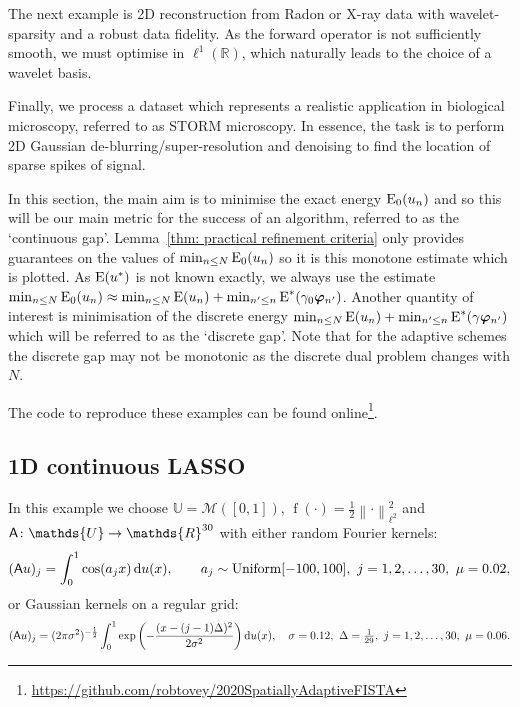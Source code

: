 \documentclass[smallextended]{svjour3}
\let\F\mathds\let\C\mathcal\newcommand{\R}{\F{R}}\newcommand{\A}{\tens{A}}
\newcommand{\norm}[1]{{\left\lVert #1 \right\rVert}}
\newcommand{\op}[1]{\operatorname{#1}}
\newcommand{\1}{\F{1}}
\newcommand{\diff}{\mathop{}\!\mathrm{d}}
\newcommand*{\var}[1]{%
	\IfEqCase{#1}{%
		{0}{u}%
		{1}{v}%
		{2}{w}%
	}[u#1]%
}
\newcommand*{\vars}[1]{%
	\IfEqCase{#1}{%
		{0}{\alpha}%
		{1}{\beta}%
		{2}{\gamma}%
		{3}{a}%
		{4}{b}%
		{5}{c}%
	}[k#1]%
}
\begin{document}
	The next example is 2D reconstruction from Radon or X-ray data with wavelet-sparsity and a robust data fidelity. As the forward operator is not sufficiently smooth, we must optimise in $\ell^1(\R)$, which naturally leads to the choice of a wavelet basis. 
	
	Finally, we process a dataset which represents a realistic application in biological microscopy, referred to as STORM microscopy. In essence, the task is to perform 2D Gaussian de-blurring/super-resolution and denoising to find the location of sparse spikes of signal.
	
	In this section, the main aim is to minimise the exact energy $\op{E}_0(\var0_n)$ and so this will be our main metric for the success of an algorithm, referred to as the `continuous gap'. Lemma~\ref{thm: practical refinement criteria} only provides guarantees on the values of $\min_{n\leq N}\op{E}_0(\var0_n)$ so it is this monotone estimate which is plotted. As $\op{E}(\var0^*)$ is not known exactly, we always use the estimate $\min_{n\leq N}\op{E}_0(\var0_n) \approx \min_{n\leq N}\op{E}(\var0_n) + \min_{n'\leq n}\op{E}^*(\vars2_0\vec{\varphi}_{n'})$. Another quantity of interest is minimisation of the discrete energy $\min_{n\leq N}\op{E}(\var0_n) + \min_{n'\leq n}\op{E}^*(\vars2\vec{\varphi}_{n'})$ which will be referred to as the `discrete gap'. Note that for the adaptive schemes the discrete gap may not be monotonic as the discrete dual problem changes with $N$.
	
	The code to reproduce these examples can be found online\footnote{\href{https://github.com/robtovey/2020SpatiallyAdaptiveFISTA}{https://github.com/robtovey/2020SpatiallyAdaptiveFISTA}}.
	
	
	\subsection{1D continuous LASSO}\label{sec: 1D Lasso examples}
	In this example we choose $\F{U}=\C M([0,1])$, $\op{f}(\cdot)=\frac12\norm{\cdot}_{\ell^2}^2$ and $\A\colon \F{U}\to \R^{30}$ with either random Fourier kernels:
	\begin{equation}
		(\A\var0)_j = \int_0^1\cos(\vars3_jx)\diff\var0(x), \qquad \vars3_j\sim \op{Uniform}[-100,100],\ j=1,2,\ldots,30,\ \mu =0.02, 
	\end{equation}
	or Gaussian kernels on a regular grid:
	\begin{equation}
		(\A\var0)_j = (2\pi\sigma^2)^{-\frac12}\int_0^1\exp\left(-\frac{(x-(j-1)\Delta)^2}{2\sigma^2}\right)\diff\var0(x), \quad \sigma=0.12,\ \Delta = \tfrac1{29},\ j=1,2,\ldots,30,\ \mu=0.06.
	\end{equation}
	
\end{document}
